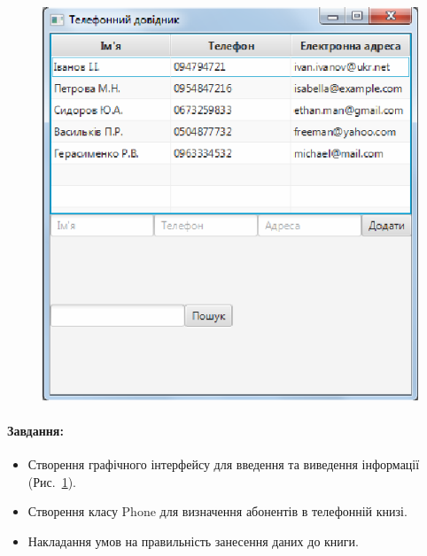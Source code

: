 \begin{figure}[h]
	\includegraphics{javafx/images/image1.png}
	\caption{}
	\label{fig16:image1}
\end{figure}

\paragraph{Завдання:}
\begin{itemize}
	\item Створення графічного інтерфейсу для введення та виведення інформації (Рис.~\ref{fig16:image1}).
	\item Створення класу Phone для визначення абонентів  в телефонній книзі.
	\item Накладання умов на правильність занесення даних до книги.
\end{itemize}

